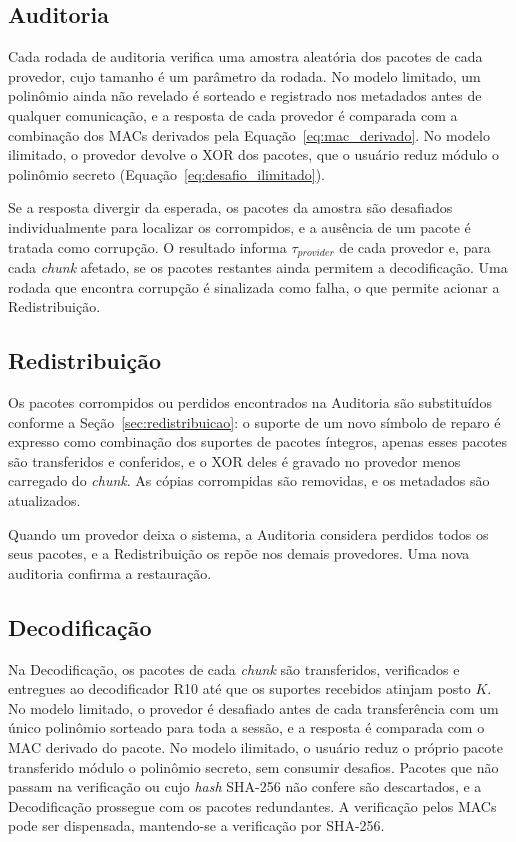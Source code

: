\subsection{Auditoria}
Cada rodada de auditoria verifica uma amostra aleatória dos pacotes de cada provedor, cujo tamanho é um parâmetro da rodada. No modelo limitado, um polinômio ainda não revelado é sorteado e registrado nos metadados antes de qualquer comunicação, e a resposta de cada provedor é comparada com a combinação dos \acrshort{MAC}s derivados pela Equação~\eqref{eq:mac_derivado}. No modelo ilimitado, o provedor devolve o XOR dos pacotes, que o usuário reduz módulo o polinômio secreto (Equação~\eqref{eq:desafio_ilimitado}).

Se a resposta divergir da esperada, os pacotes da amostra são desafiados individualmente para localizar os corrompidos, e a ausência de um pacote é tratada como corrupção. O resultado informa $\tau_{provider}$ de cada provedor e, para cada \emph{chunk} afetado, se os pacotes restantes ainda permitem a decodificação. Uma rodada que encontra corrupção é sinalizada como falha, o que permite acionar a Redistribuição.

\subsection{Redistribuição}
Os pacotes corrompidos ou perdidos encontrados na Auditoria são substituídos conforme a Seção~\ref{sec:redistribuicao}: o suporte de um novo símbolo de reparo é expresso como combinação dos suportes de pacotes íntegros, apenas esses pacotes são transferidos e conferidos, e o XOR deles é gravado no provedor menos carregado do \emph{chunk}. As cópias corrompidas são removidas, e os metadados são atualizados.

Quando um provedor deixa o sistema, a Auditoria considera perdidos todos os seus pacotes, e a Redistribuição os repõe nos demais provedores. Uma nova auditoria confirma a restauração.

\subsection{Decodificação}
Na Decodificação, os pacotes de cada \emph{chunk} são transferidos, verificados e entregues ao decodificador R10 até que os suportes recebidos atinjam posto $K$. No modelo limitado, o provedor é desafiado antes de cada transferência com um único polinômio sorteado para toda a sessão, e a resposta é comparada com o \acrshort{MAC} derivado do pacote. No modelo ilimitado, o usuário reduz o próprio pacote transferido módulo o polinômio secreto, sem consumir desafios. Pacotes que não passam na verificação ou cujo \emph{hash} SHA-256 não confere são descartados, e a Decodificação prossegue com os pacotes redundantes. A verificação pelos \acrshort{MAC}s pode ser dispensada, mantendo-se a verificação por SHA-256.

